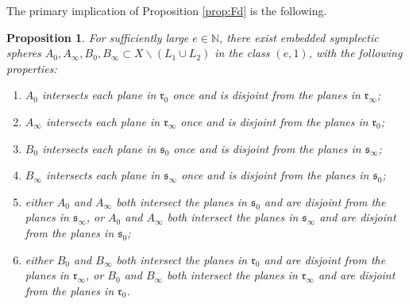 \documentclass[12pt]{amsart}
\newtheorem{proposition}[theorem]{Proposition}
\theoremstyle{definition}
\newcommand{\NN}{{\mathbb N}}
\begin{document}


The primary implication of Proposition \ref{prop:Fd} is the following.


\begin{proposition}\label{subaxis} For sufficiently large $e \in \NN$, there exist embedded symplectic spheres $A_0, A_{\infty}, B_0, B_{\infty} \subset X \smallsetminus (L_1 \cup L_2)$ in the class $(e,1)$, with the following properties:
\begin{enumerate}
\item $A_0$ intersects each plane in $\mathfrak{r}_0$ once and is disjoint from the planes in $\mathfrak{r}_{\infty}$;
\item $A_{\infty}$ intersects each plane in $\mathfrak{r}_{\infty}$ once and is disjoint from the planes in $\mathfrak{r}_0$;
\item $B_0$ intersects each plane in $\mathfrak{s}_0$ once and is disjoint from the planes in $\mathfrak{s}_{\infty}$;
\item $B_{\infty}$ intersects each plane in $\mathfrak{s}_{\infty}$ once and is disjoint from the planes in $\mathfrak{s}_0$;
\item either $A_0$ and $A_{\infty}$ both intersect the planes in $\mathfrak{s}_0$ and are disjoint from the planes in $\mathfrak{s}_{\infty}$, or $A_0$ and $A_{\infty}$ both intersect the planes in $\mathfrak{s}_{\infty}$ and are disjoint from the planes in $\mathfrak{s}_0$;
\item either $B_0$ and $B_{\infty}$ both intersect the planes in $\mathfrak{r}_0$ and are disjoint from the planes in $\mathfrak{r}_{\infty}$, or $B_0$ and $B_{\infty}$ both intersect the planes in $\mathfrak{r}_{\infty}$ and are disjoint from the planes in $\mathfrak{r}_0$.
\end{enumerate}
\end{proposition}
\end{document}
